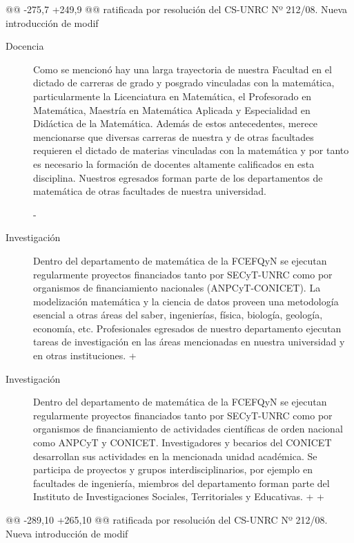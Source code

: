  
 
@@ -275,7 +249,9 @@ ratificada por resolución del CS-UNRC Nº 212/08.  Nueva introducción de modif
 \begin{description}
  \item[Docencia] Como se mencionó hay una larga trayectoria  de nuestra Facultad en el dictado de carreras de grado y posgrado  vinculadas con la matemática, particularmente la Licenciatura en Matemática, el Profesorado en Matemática, Maestría en Matemática Aplicada y Especialidad en Didáctica de la Matemática. Además de estos antecedentes, merece mencionarse que diversas carreras de nuestra y de otras facultades requieren el dictado de materias vinculadas con la matemática y por tanto es necesario la formación de docentes altamente calificados en esta disciplina. Nuestros egresados forman parte de los departamentos de matemática de otras facultades de nuestra universidad.
  
- \item[Investigación] Dentro del departamento de matemática de la FCEFQyN se ejecutan regularmente  proyectos financiados tanto por SECyT-UNRC como por organismos de financiamiento nacionales (ANPCyT-CONICET). La modelización matemática y la ciencia de datos proveen una metodología esencial a otras áreas del saber, ingenierías, física, biología, geología, economía, etc. Profesionales egresados de nuestro departamento ejecutan tareas de investigación en las áreas mencionadas en nuestra universidad y en otras instituciones.
+ \item[Investigación] Dentro del departamento de matemática de la FCEFQyN se ejecutan regularmente  proyectos financiados tanto por SECyT-UNRC como por organismos de financiamiento de actividades científicas de orden  nacional como ANPCyT y CONICET. Investigadores y becarios del CONICET desarrollan sus actividades en la mencionada unidad académica. Se participa de proyectos y grupos interdisciplinarios, por ejemplo en  facultades de ingeniería, miembros del departamento forman parte  del Instituto de Investigaciones Sociales, Territoriales y  Educativas.   
+ 
+
  
  
 \end{description}
@@ -289,10 +265,10 @@ ratificada por resolución del CS-UNRC Nº 212/08.  Nueva introducción de modif
 
